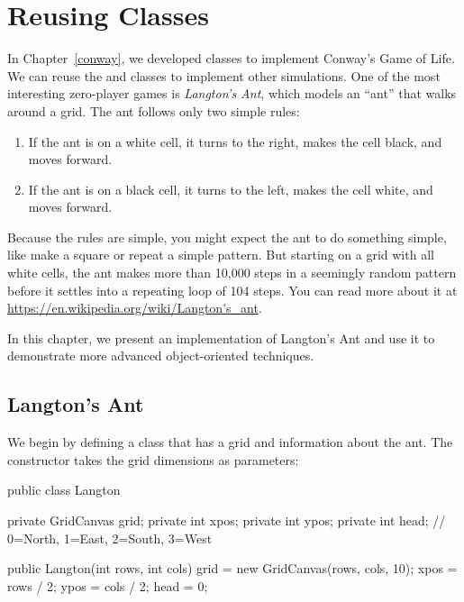 \chapter{Reusing Classes}

In Chapter~\ref{conway}, we developed classes to implement Conway's Game of Life.
We can reuse the  and  classes to implement other simulations.
One of the most interesting zero-player games is {\it Langton's Ant}, which models an ``ant'' that walks around a grid.
The ant follows only two simple rules:

\begin{enumerate}
\item If the ant is on a white cell, it turns to the right, makes the cell black, and moves forward.
\item If the ant is on a black cell, it turns to the left, makes the cell white, and moves forward.
\end{enumerate}

Because the rules are simple, you might expect the ant to do something simple, like make a square or repeat a simple pattern.
But starting on a grid with all white cells, the ant makes more than 10,000 steps in a seemingly random pattern before it settles into a repeating loop of 104 steps.
You can read more about it at \url{https://en.wikipedia.org/wiki/Langton's_ant}.


In this chapter, we present an implementation of Langton's Ant and use it to demonstrate more advanced object-oriented techniques.


\section{Langton's Ant}

We begin by defining a  class that has a grid and information about the ant.
The constructor takes the grid dimensions as parameters:

\begin{code}
public class Langton {
    private GridCanvas grid;
    private int xpos;
    private int ypos;
    private int head; // 0=North, 1=East, 2=South, 3=West

    public Langton(int rows, int cols) {
        grid = new GridCanvas(rows, cols, 10);
        xpos = rows / 2;
        ypos = cols / 2;
        head = 0;
    }
}
\end{code}

